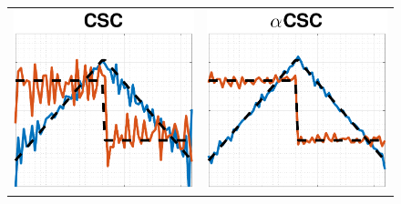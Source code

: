 \begin{figure}[t]
\begin{center}
{\begin{tabular}{c c}
\\
        \includegraphics[width=\tmpsize\linewidth]{figures/synth_2_1_v2.pdf} &
        \includegraphics[width=\tmpsize\linewidth]{figures/synth_2_2_v2.pdf}

\end{tabular}}
\end{center}
\end{figure}

